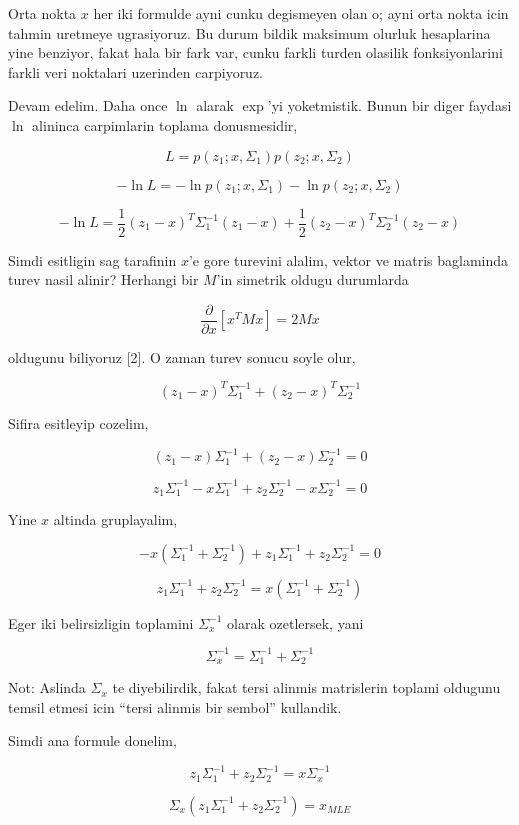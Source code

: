 \documentclass[12pt,fleqn]{article}\usepackage{../common}
\begin{document}
Orta nokta $x$ her iki formulde ayni cunku degismeyen olan o; ayni orta
nokta icin tahmin uretmeye ugrasiyoruz. Bu durum bildik maksimum olurluk
hesaplarina yine benziyor, fakat hala bir fark var, cunku farkli turden
olasilik fonksiyonlarini farkli veri noktalari uzerinden carpiyoruz. 

Devam edelim. Daha once $\ln$ alarak $\exp$'yi yoketmistik. Bunun bir diger
faydasi $\ln$ alininca carpimlarin toplama donusmesidir, 

$$ L = p(z_1;x,\Sigma_1) p(z_2;x,\Sigma_2) 
$$

$$ -\ln L = -\ln p(z_1;x,\Sigma_1) -\ln p(z_2;x,\Sigma_2) 
$$

$$ -\ln L = 
\frac{ 1}{2}(z_1-x)^T\Sigma_1^{-1}(z_1-x) + 
\frac{ 1}{2}(z_2-x)^T\Sigma_2^{-1}(z_2-x)
$$

Simdi esitligin sag tarafinin $x$'e gore turevini alalim, vektor ve matris
baglaminda turev nasil alinir? Herhangi bir $M$'in simetrik oldugu
durumlarda

$$ \frac{\partial}{\partial x}[x^TMx] = 2Mx $$

oldugunu biliyoruz [2]. O zaman turev sonucu soyle olur, 

$$ 
(z_1-x)^T\Sigma_1^{-1} +  (z_2-x)^T\Sigma_2^{-1}
$$

Sifira esitleyip cozelim, 

$$ 
(z_1-x)\Sigma_1^{-1} +  (z_2-x)\Sigma_2^{-1} = 0
$$

$$ 
z_1\Sigma_1^{-1} - x\Sigma_1^{-1} + z_2\Sigma_2^{-1} - x\Sigma_2^{-1} = 0
$$

Yine $x$ altinda gruplayalim,

$$ 
-x(\Sigma_1^{-1} + \Sigma_2^{-1}) + z_1\Sigma_1^{-1}  + z_2\Sigma_2^{-1}  = 0
$$

$$ 
z_1\Sigma_1^{-1}  + z_2\Sigma_2^{-1}  = x(\Sigma_1^{-1} + \Sigma_2^{-1}) 
$$

Eger iki belirsizligin toplamini $\Sigma_x^{-1}$ olarak ozetlersek, yani 

$$ 
\Sigma_x^{-1} = \Sigma_1^{-1} + \Sigma_2^{-1}
$$

Not: Aslinda $\Sigma_x$ te diyebilirdik, fakat tersi alinmis matrislerin
toplami oldugunu temsil etmesi icin ``tersi alinmis bir sembol''
kullandik. 

Simdi ana formule donelim,

$$ 
z_1\Sigma_1^{-1}  + z_2\Sigma_2^{-1}  = x\Sigma_x^{-1}
$$


$$ 
\Sigma_x (z_1\Sigma_1^{-1}  + z_2\Sigma_2^{-1}) = x_{MLE}
$$
\end{document}
